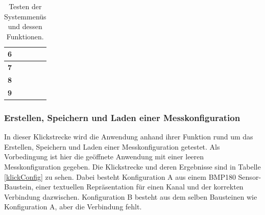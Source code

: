 \documentclass[parskip=full]{scrartcl}
\begin{document}
\begin{table}[h]
\begin{tabular}{| p{} | p{} | p{} | p{} |}
	\textbf{6}
	& 
	
	&
	
	& 
	
	\\ \hline

	\textbf{7}
	& 
	
	&
	
	& 
	
	\\ \hline

	\textbf{8}
	& 
	
	&
	
	& 
	
	\\ \hline

	\textbf{9}
	& 
	
	&
	
	& 
	
	\\ \hline
	
\end{tabular}
\caption{Testen der Systemmenüs und dessen Funktionen.}
\label{klickMenu}
\end{table} 

\subsubsection{Erstellen, Speichern und Laden einer Messkonfiguration}

In dieser Klickstrecke wird die Anwendung anhand ihrer Funktion rund um das Erstellen, Speichern und Laden einer Messkonfiguration getestet. Als Vorbedingung ist hier die geöffnete Anwendung mit einer leeren Messkonfiguration gegeben. Die Klickstrecke und deren Ergebnisse sind in Tabelle \ref{klickConfig} zu sehen. Dabei besteht Konfiguration A aus einem BMP180 Sensor-Baustein, einer textuellen Repräsentation für einen Kanal und der korrekten Verbindung dazwischen. Konfiguration B besteht aus dem selben Bausteinen wie Konfiguration A, aber die Verbindung fehlt.  
\end{document}
